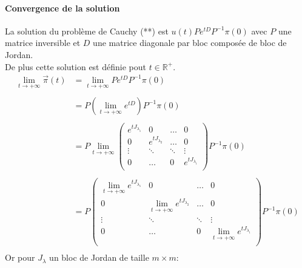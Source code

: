 \documentclass[a4paper]{article}
\theoremstyle{plain}
\theoremstyle{definition}
\theoremstyle{remark}
\begin{document}

\paragraph{Convergence de la solution}
La solution du problème de Cauchy (**) est $u(t)Pe^{tD}P^{-1}\pi(0)$ avec $P$ une matrice inversible et $D$ une matrice diagonale par bloc composée de bloc de Jordan.\\
De plus cette solution est définie pout $t\in \mathbb{R}^+$. 
\begin{align*}
    \lim\limits_{t \rightarrow +\infty}\vec{\pi}(t)&=\lim\limits_{t \rightarrow +\infty}Pe^{tD}P^{-1}\pi(0)\\
    \\
    &=P\left(\lim\limits_{t \rightarrow +\infty}e^{tD}\right)P^{-1}\pi(0)\\
    \\
    &=P\lim\limits_{t \rightarrow +\infty}\begin{pmatrix}
e^{tJ_{\lambda_1}}&0&\hdots&0\\
0&e^{tJ_{\lambda_2}}&\hdots&0\\
\vdots&\ddots&\ddots&\vdots\\
0&\hdots&0&e^{tJ_{\lambda_i}}\\
\end{pmatrix}P^{-1}\pi(0)\\
\\
&=P\begin{pmatrix}
\lim\limits_{t \rightarrow +\infty}e^{tJ_{\lambda_1}}&0&\hdots&0\\
0&\lim\limits_{t \rightarrow +\infty}e^{tJ_{\lambda_2}}&\hdots&0\\
\vdots&\ddots&\ddots&\vdots\\
0&\hdots&0&\lim\limits_{t \rightarrow +\infty}e^{tJ_{\lambda_i}}\\
\end{pmatrix}P^{-1}\pi(0)\\
\end{align*}
Or pour $J_\lambda$ un bloc de Jordan de taille $m\times m$:
\end{document}
